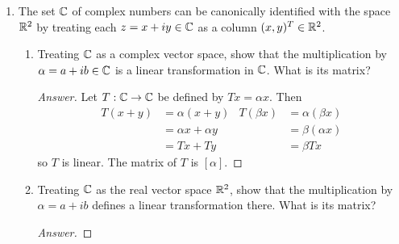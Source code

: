 \documentclass[../psets.tex]{subfiles}
\begin{document}
\begin{enumerate}[label={\textbf{3.\arabic*.}}]
\begin{enumerate}
\begin{proof}[Answer]
\begin{equation*}
            \end{equation*}
        \end{proof}
        \item $T:\Pm_n\to\Pm_n$ defined by $Tf(t)=2f(t)+3f'(t)-4f''(t)$ (again with respect to the standard basis $1,t,t^2,\dots,t^n$).
        \begin{proof}[Answer]
            \begin{equation*}
                \begin{pmatrix}
                    2 & 3 & -8 &  & 0\\
                    0 & 2 & 6 & \ddots & 0\\
                    0 & 0 & 2 & \ddots & -4n(n-1)\\
                    \vdots & \vdots &  & \ddots & 3n\\
                    0 & 0 & 0 &  & 2\\
                \end{pmatrix}
            \end{equation*}
        \end{proof}
    \end{enumerate}
    \setcounter{enumi}{5}
    \item The set $\mathbb{C}$ of complex numbers can be canonically identified with the space $\mathbb{R}^2$ by treating each $z=x+iy\in\mathbb{C}$ as a column $(x,y)^T\in\mathbb{R}^2$.
    \begin{enumerate}
        \item Treating $\mathbb{C}$ as a complex vector space, show that the multiplication by $\alpha=a+ib\in\mathbb{C}$ is a linear transformation in $\mathbb{C}$. What is its matrix?
        \begin{proof}[Answer]
            Let $T:\mathbb{C}\to\mathbb{C}$ be defined by $Tx=\alpha x$. Then
            \begin{align*}
                T(x+y) &= \alpha(x+y)&
                    T(\beta x) &= \alpha(\beta x)\\
                &= \alpha x+\alpha y&
                    &= \beta(\alpha x)\\
                &= Tx+Ty&
                    &= \beta Tx
            \end{align*}
            so $T$ is linear. The matrix of $T$ is $[\alpha]$.
        \end{proof}
        \item Treating $\mathbb{C}$ as the real vector space $\mathbb{R}^2$, show that the multiplication by $\alpha=a+ib$ defines a linear transformation there. What is its matrix?
        \begin{proof}[Answer]

\end{proof}
\end{enumerate}
\end{enumerate}
\end{document}
